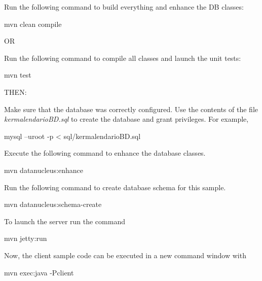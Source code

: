 Run the following command to build everything and enhance the DB classes\+: \begin{DoxyVerb}  mvn clean compile
\end{DoxyVerb}
 OR

Run the following command to compile all classes and launch the unit tests\+: \begin{DoxyVerb}  mvn test
\end{DoxyVerb}
 THEN\+:

Make sure that the database was correctly configured. Use the contents of the file {\itshape kermalendario\+BD.\+sql} to create the database and grant privileges. For example, \begin{DoxyVerb}  mysql –uroot -p < sql/kermalendarioBD.sql
\end{DoxyVerb}
 Execute the following command to enhance the database classes. \begin{DoxyVerb}  mvn datanucleus:enhance
\end{DoxyVerb}
 Run the following command to create database schema for this sample. \begin{DoxyVerb}  mvn datanucleus:schema-create
\end{DoxyVerb}
 To launch the server run the command \begin{DoxyVerb}mvn jetty:run
\end{DoxyVerb}
 Now, the client sample code can be executed in a new command window with \begin{DoxyVerb}mvn exec:java -Pclient
\end{DoxyVerb}
 